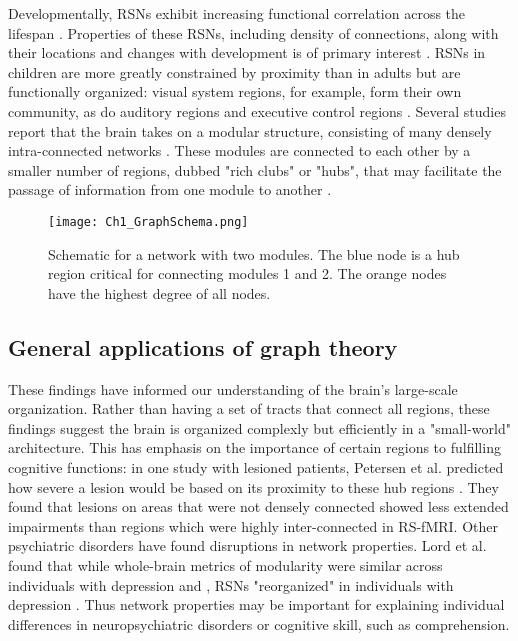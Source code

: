 Developmentally, RSNs exhibit increasing functional correlation across the lifespan \cite{Kesler2013, Uddin2010}. Properties of these RSNs, including density of connections, along with their locations and changes with development is of primary interest  \cite{Cole2014, Dosenbach2007, Fair2009}. RSNs in children are more greatly constrained by proximity than in adults but are functionally organized: visual system regions, for example, form their own community, as do auditory regions and executive control regions \cite{Seeley2007}. Several studies report that the brain takes on a modular structure, consisting of many densely intra-connected networks \cite{Bullmore2009, Fair2009, Supekar2009, Dosenbach2007}. These modules are connected to each other by a smaller number of regions, dubbed "rich clubs" or "hubs", that may facilitate the passage of information from one module to another \cite{Power2013, Bullmore2012}. 

\begin{figure}[t]
    \centering
    \texttt{[image: Ch1\_GraphSchema.png]}
    \caption[Schematic for a network with two modules.]{Schematic for a network with two modules. The blue node is a hub region critical for connecting modules 1 and 2. The orange nodes have the highest degree of all nodes.}
\end{figure}

\subsection{General applications of graph theory}

These findings have informed our understanding of the brain's large-scale organization. Rather than having a set of tracts that connect all regions, these findings suggest the brain is organized complexly but efficiently in a "small-world" architecture. This has emphasis on the importance of certain regions to fulfilling cognitive functions: in one study with lesioned patients, Petersen et al. predicted how severe a lesion would be based on its proximity to these hub regions \cite{Warren2014}. They found that lesions on areas that were not densely connected showed less extended impairments than regions which were highly inter-connected in RS-fMRI. Other psychiatric disorders have found disruptions in network properties. Lord et al. found that while whole-brain metrics of modularity were similar across individuals with depression and , RSNs "reorganized" in individuals with depression \cite{Lord2012}. Thus network properties may be important for explaining individual differences in neuropsychiatric disorders or cognitive skill, such as comprehension. 

